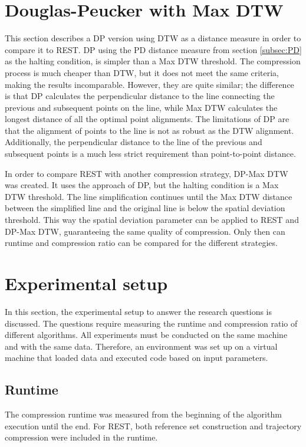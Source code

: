 \section{Douglas-Peucker with Max DTW}
This section describes a DP version using DTW as a distance measure in order to compare it to REST. DP using the PD distance measure from section \ref{subsec:PD} as the halting condition, is simpler than a Max DTW threshold. The compression process is much cheaper than DTW, but it does not meet the same criteria, making the results incomparable. However, they are quite similar; the difference is that DP calculates the perpendicular distance to the line connecting the previous and subsequent points on the line, while Max DTW calculates the longest distance of all the optimal point alignments. The limitations of DP are that the alignment of points to the line is not as robust as the DTW alignment. Additionally, the perpendicular distance to the line of the previous and subsequent points is a much less strict requirement than point-to-point distance.

In order to compare REST with another compression strategy, DP-Max DTW was created. It uses the approach of DP, but the halting condition is a Max DTW threshold. The line simplification continues until the Max DTW distance between the simplified line and the original line is below the spatial deviation threshold. This way the spatial deviation parameter can be applied to REST and DP-Max DTW, guaranteeing the same quality of compression. Only then can runtime and compression ratio can be compared for the different strategies.

\section{Experimental setup}
In this section, the experimental setup to answer the research questions is discussed. The questions require measuring the runtime and compression ratio of different algorithms. All experiments must be conducted on the same machine and with the same data. Therefore, an environment was set up on a virtual machine that loaded data and executed code based on input parameters.

\subsection{Runtime}
The compression runtime was measured from the beginning of the algorithm execution until the end. For REST, both reference set construction and trajectory compression were included in the runtime.

